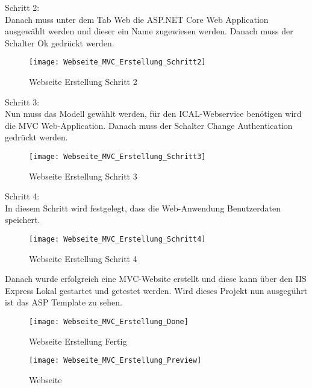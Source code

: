 {\begin{figure}[H]
\end{figure}
Schritt 2:\\
Danach muss unter dem Tab Web die ASP.NET Core Web Application ausgewählt werden und dieser ein Name zugewiesen werden. Danach muss der Schalter Ok gedrückt werden.\\
\begin{figure}[H]
    \texttt{[image: Webseite\_MVC\_Erstellung\_Schritt2]}
    \caption{Webseite Erstellung Schritt 2}
    \label{fig:weberstell2}
\end{figure}
Schritt 3:\\
Nun muss das Modell gewählt werden, für den ICAL-Webservice benötigen wird die  MVC Web-Application. Danach muss der Schalter Change Authentication gedrückt werden. \\
\begin{figure}[H]
    \texttt{[image: Webseite\_MVC\_Erstellung\_Schritt3]}
    \caption{Webseite Erstellung Schritt 3}
    \label{fig:weberstell3}
\end{figure}Schritt 4:\\
In diesem Schritt wird festgelegt, dass die Web-Anwendung Benutzerdaten speichert.
\begin{figure}[H]
    \texttt{[image: Webseite\_MVC\_Erstellung\_Schritt4]}
    \caption{Webseite Erstellung Schritt 4}
    \label{fig:weberstell4}
\end{figure}
Danach wurde erfolgreich eine MVC-Website erstellt und diese kann über den IIS Express Lokal gestartet und getestet werden. Wird dieses Projekt nun ausgegührt ist das ASP Template zu sehen.\\
\begin{figure}[H]
    \texttt{[image: Webseite\_MVC\_Erstellung\_Done]}
    \caption{Webseite Erstellung Fertig}
    \label{fig:weberstellfertig}
\end{figure}
\begin{figure}[H]
    \texttt{[image: Webseite\_MVC\_Erstellung\_Preview]}
    \caption{Webseite}
    \label{fig:webseite}
\end{figure}
}
